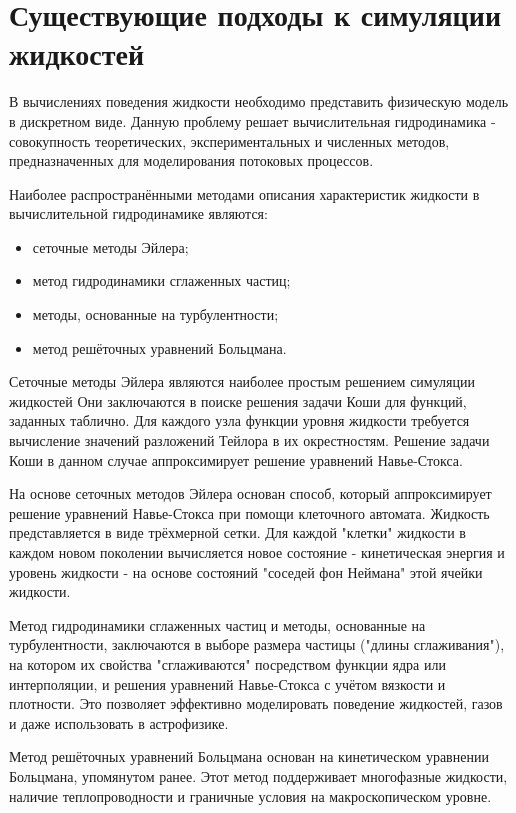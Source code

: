 \section{Существующие подходы к симуляции жидкостей}

В вычислениях поведения жидкости необходимо представить физическую модель в
 дискретном виде. Данную проблему решает вычислительная гидродинамика - совокупность
 теоретических, экспериментальных и численных методов, предназначенных для моделирования
 потоковых процессов.

Наиболее распространёнными методами описания характеристик жидкости в
вычислительной гидродинамике являются:
\begin{itemize}
    \item сеточные методы Эйлера;
    \item метод гидродинамики сглаженных частиц;
    \item методы, основанные на турбулентности;
    \item метод решёточных уравнений Больцмана.\cite{book:ash}
\end{itemize}

Сеточные методы Эйлера являются наиболее простым решением симуляции жидкостей
Они заключаются в поиске решения задачи Коши для функций,
заданных таблично. Для каждого узла функции уровня жидкости
 требуется вычисление значений разложений Тейлора в их окрестностям. Решение задачи Коши
 в данном случае аппроксимирует решение уравнений Навье-Стокса\cite{book:compmath}.

На основе сеточных методов Эйлера основан способ, который аппроксимирует
решение уравнений Навье-Стокса при помощи клеточного автомата\cite{conference:cellauto}.
Жидкость представляется в виде трёхмерной сетки.
Для каждой "клетки" жидкости в каждом новом поколении вычисляется новое состояние - кинетическая энергия и
уровень жидкости - на основе состояний "соседей фон Неймана" этой ячейки жидкости.

Метод гидродинамики сглаженных частиц и методы, основанные на турбулентности,
заключаются в выборе размера частицы ("длины сглаживания"), на котором их свойства
"сглаживаются" посредством функции ядра или интерполяции, и решения уравнений
Навье-Стокса с учётом вязкости и плотности. Это позволяет эффективно моделировать
поведение жидкостей, газов и даже использовать в астрофизике\cite{site:astro}.

 Метод решёточных уравнений Больцмана основан на кинетическом уравнении Больцмана,
 упомянутом ранее. Этот метод поддерживает многофазные жидкости, наличие теплопроводности
 и граничные условия на макроскопическом уровне\cite{site:habr-physics}.

